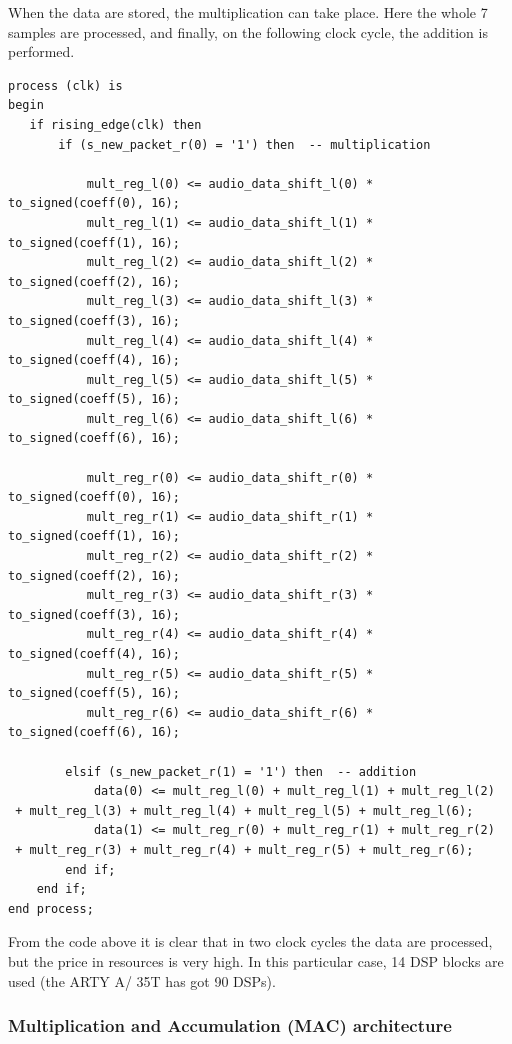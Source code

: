 \documentclass[11pt, a4paper]{article}
\begin{document}
When the data are stored, the multiplication can take place. Here the whole 7 samples are processed, and finally, on the following clock cycle, the addition is performed.

\begin{lstlisting}[style={VHDL-style}]
process (clk) is
begin
   if rising_edge(clk) then
       if (s_new_packet_r(0) = '1') then  -- multiplication
            
           mult_reg_l(0) <= audio_data_shift_l(0) * to_signed(coeff(0), 16);
           mult_reg_l(1) <= audio_data_shift_l(1) * to_signed(coeff(1), 16);
           mult_reg_l(2) <= audio_data_shift_l(2) * to_signed(coeff(2), 16);
           mult_reg_l(3) <= audio_data_shift_l(3) * to_signed(coeff(3), 16);
           mult_reg_l(4) <= audio_data_shift_l(4) * to_signed(coeff(4), 16);
           mult_reg_l(5) <= audio_data_shift_l(5) * to_signed(coeff(5), 16);
           mult_reg_l(6) <= audio_data_shift_l(6) * to_signed(coeff(6), 16);

           mult_reg_r(0) <= audio_data_shift_r(0) * to_signed(coeff(0), 16);
           mult_reg_r(1) <= audio_data_shift_r(1) * to_signed(coeff(1), 16);
           mult_reg_r(2) <= audio_data_shift_r(2) * to_signed(coeff(2), 16);
           mult_reg_r(3) <= audio_data_shift_r(3) * to_signed(coeff(3), 16);
           mult_reg_r(4) <= audio_data_shift_r(4) * to_signed(coeff(4), 16);
           mult_reg_r(5) <= audio_data_shift_r(5) * to_signed(coeff(5), 16);
           mult_reg_r(6) <= audio_data_shift_r(6) * to_signed(coeff(6), 16);

        elsif (s_new_packet_r(1) = '1') then  -- addition
            data(0) <= mult_reg_l(0) + mult_reg_l(1) + mult_reg_l(2)
 + mult_reg_l(3) + mult_reg_l(4) + mult_reg_l(5) + mult_reg_l(6);
            data(1) <= mult_reg_r(0) + mult_reg_r(1) + mult_reg_r(2)
 + mult_reg_r(3) + mult_reg_r(4) + mult_reg_r(5) + mult_reg_r(6);
        end if;
    end if;
end process;
\end{lstlisting}

From the code above it is clear that in two clock cycles the data are processed, but the price in resources is very high. In this particular case, 14 DSP blocks are used (the ARTY A/ 35T has got 90 DSPs).


\subsubsection{Multiplication and Accumulation (MAC) architecture}
\end{document}

